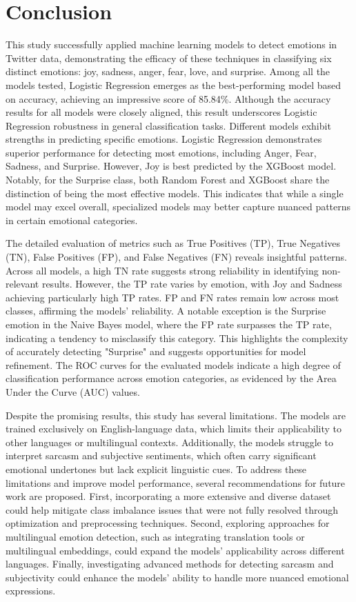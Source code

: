 

\section{Conclusion}

This study successfully applied machine learning models to detect emotions in Twitter data, demonstrating the efficacy of these techniques in classifying six distinct emotions: joy, sadness, anger, fear, love, and surprise. Among all the models tested, Logistic Regression emerges as the best-performing model based on accuracy, achieving an impressive score of 85.84\%. Although the accuracy results for all models were closely aligned, this result underscores Logistic Regression robustness in general classification tasks. Different models exhibit strengths in predicting specific emotions. Logistic Regression demonstrates superior performance for detecting most emotions, including Anger, Fear, Sadness, and Surprise. However, Joy is best predicted by the XGBoost model. Notably, for the Surprise class, both Random Forest and XGBoost share the distinction of being the most effective models. This indicates that while a single model may excel overall, specialized models may better capture nuanced patterns in certain emotional categories. 

The detailed evaluation of metrics such as True Positives (TP), True Negatives (TN), False Positives (FP), and False Negatives (FN) reveals insightful patterns. Across all models, a high TN rate suggests strong reliability in identifying non-relevant results. However, the TP rate varies by emotion, with Joy and Sadness achieving particularly high TP rates. FP and FN rates remain low across most classes, affirming the models' reliability. A notable exception is the Surprise emotion in the Naive Bayes model, where the FP rate surpasses the TP rate, indicating a tendency to misclassify this category. This highlights the complexity of accurately detecting "Surprise" and suggests opportunities for model refinement. The ROC curves for the evaluated models indicate a high degree of classification performance across emotion categories, as evidenced by the Area Under the Curve (AUC) values.

Despite the promising results, this study has several limitations. The models are trained exclusively on English-language data, which limits their applicability to other languages or multilingual contexts. Additionally, the models struggle to interpret sarcasm and subjective sentiments, which often carry significant emotional undertones but lack explicit linguistic cues. To address these limitations and improve model performance, several recommendations for future work are proposed. First, incorporating a more extensive and diverse dataset could help mitigate class imbalance issues that were not fully resolved through optimization and preprocessing techniques. Second, exploring approaches for multilingual emotion detection, such as integrating translation tools or multilingual embeddings, could expand the models' applicability across different languages. Finally, investigating advanced methods for detecting sarcasm and subjectivity could enhance the models' ability to handle more nuanced emotional expressions.

